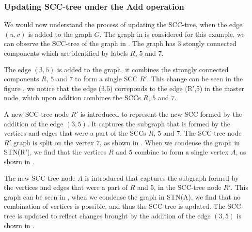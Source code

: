 \subsubsection{Updating SCC-tree under the Add operation}\label{Subsubsec: Updating SCC-tree under the Add operation}

We would now understand the process of updating the SCC-tree, when the edge $(u, v)$ is added to the graph $G$.
The graph in \figureref{\ref{fig:graph2}} is considered for this example, we can observe the SCC-tree of the graph in \figureref{\ref{fig:scc_tree2}}.
The graph has 3 stongly connected components which are identified by labels $R$, $5$ and $7$. 



The edge $(3,5)$ is added to the graph, it combines the strongly connected components $R$, $5$ and $7$ to form a single SCC $R'$.
This change can be seen in the figure \figureref{\ref{fig:graph2_condense}}, we notice that the edge (3,5) correponds to the edge (R',5)
in the master node, which upon addtion combines the SCCs $R$, $5$ and $7$.



A new SCC-tree node $R'$ is introduced to represent the new SCC formed by the addition of the edge $(3,5)$.
It captures the subgraph that is formed by the vertices and edges that were a part of the SCCs $R$, $5$ and $7$.
The SCC-tree node $R'$ graph is split on the vertex $7$, as shown in \figureref{\ref{fig:stn_r_before_after_split}}.
When we condense the graph in \textsc{STN}(R'), we find that the vertices $R$ and $5$ combine to form a single vertex $A$, as shown in \figureref{\ref{fig:stn_a_and_updated_scc_tree}}.



The new SCC-tree node $A$ is introduced that captures the subgraph formed by the vertices and edges that were a part of $R$ and $5$, in the SCC-tree node $R'$. 
This graph can be seen in \figureref{\ref{fig:stn_a_and_updated_scc_tree}}, when we condense the graph in \textsc{STN}(A), we find that no combination of vertices is possible, and thus the SCC-tree is updated.
The SCC-tree is updated to reflect changes brought by the addition of the edge $(3,5)$ is shown in \figureref{\ref{fig:stn_a_and_updated_scc_tree}}.




